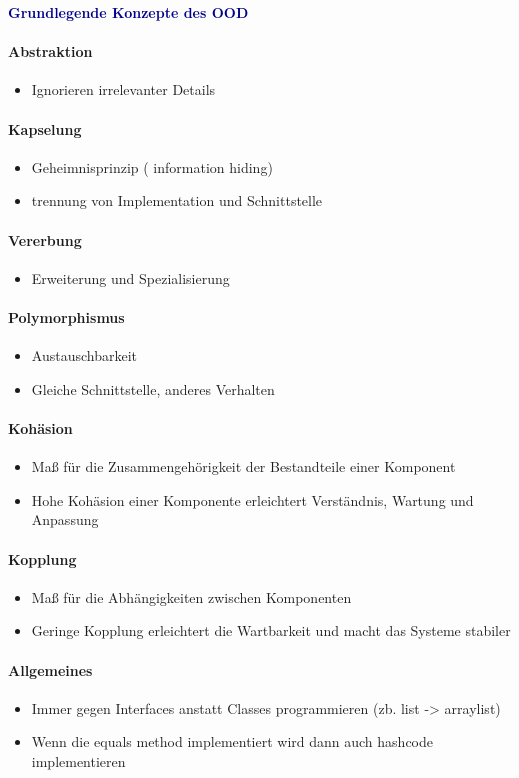 \textbf{\textcolor{darkblue}{Grundlegende Konzepte des OOD}}~
\paragraph{Abstraktion}
\begin{itemize}
	\item Ignorieren irrelevanter Details
\end{itemize}

\paragraph{Kapselung}
\begin{itemize}
	\item Geheimnisprinzip ( information hiding)
	\item trennung von Implementation und Schnittstelle
\end{itemize}

\paragraph{Vererbung}
\begin{itemize}
	\item Erweiterung und Spezialisierung
\end{itemize}

\paragraph{Polymorphismus}
\begin{itemize}
	\item Austauschbarkeit
	\item Gleiche Schnittstelle, anderes Verhalten
\end{itemize}

\paragraph{Kohäsion}
\begin{itemize}
	\item Maß für die Zusammengehörigkeit der Bestandteile einer Komponent
	\item Hohe Kohäsion einer Komponente erleichtert Verständnis, Wartung und Anpassung
\end{itemize}

\paragraph{Kopplung}
\begin{itemize}
	\item Maß für die Abhängigkeiten zwischen Komponenten
	\item Geringe Kopplung erleichtert die Wartbarkeit und macht das Systeme stabiler
\end{itemize}

\paragraph{Allgemeines}
\begin{itemize}
	\item Immer gegen Interfaces anstatt Classes programmieren  (zb. list -> arraylist)
	\item Wenn die equals method implementiert wird dann auch hashcode implementieren
\end{itemize}
